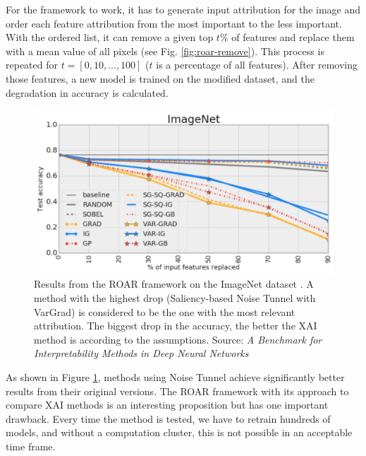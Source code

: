 For the framework to work, it has to generate input attribution for the image and order each feature attribution from the most important to the less important. With the ordered list, it can remove a given top $t\%$ of features and replace them with a mean value of all pixels (see Fig. \ref{fig:roar-remove}). This process is repeated for $t = [0, 10, ..., 100]$ ($t$ is a percentage of all features). After removing those features, a new model is trained on the modified dataset, and the degradation in accuracy is calculated.

\begin{figure}[ht]
    \centering
    \includegraphics[width=\textwidth]{methods/images/roar-results.png}
 \caption{Results from the ROAR framework on the ImageNet dataset \cite{russakovsky2015imagenet}. A method with the highest drop (Saliency-based Noise Tunnel with VarGrad) is considered to be the one with the most relevant attribution. The biggest drop in the accuracy, the better the XAI method is according to the assumptions. Source: \textit{A Benchmark for Interpretability Methods in Deep Neural Networks} \cite{hooker2018benchmark} }\label{fig:roar-results}
\end{figure}

As shown in Figure \ref{fig:roar-results}, methods using Noise Tunnel achieve significantly better results from their original versions. The ROAR framework with its approach to compare XAI methods is an interesting proposition but has one important drawback. Every time the method is tested, we have to retrain hundreds of models, and without a computation cluster, this is not possible in an acceptable time frame.